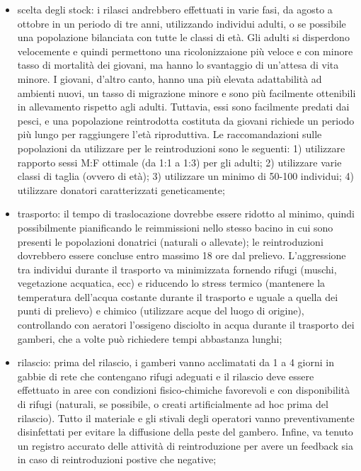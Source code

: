 \documentclass[11pt,a4paper,italian,twoside,openany]{memoir}
\begin{document}
\begin{itemize}
  \item scelta degli stock: i rilasci andrebbero effettuati in varie fasi, da agosto a ottobre in un periodo di tre anni, utilizzando individui adulti, o se possibile una popolazione bilanciata con tutte le classi di età. Gli adulti si disperdono velocemente e quindi permettono una ricolonizzaione più veloce e con minore tasso di mortalità dei giovani, ma hanno lo svantaggio di un'attesa di vita minore. I giovani, d'altro canto, hanno una più elevata adattabilità ad ambienti nuovi, un tasso di migrazione minore e sono più facilmente ottenibili in allevamento rispetto agli adulti. Tuttavia, essi sono facilmente predati dai pesci, e una popolazione reintrodotta costituta da giovani richiede un periodo più lungo per raggiungere l'età riproduttiva. Le raccomandazioni \cite{Souty-Grosset 2009} sulle popolazioni da utilizzare per le reintroduzioni sono le seguenti: 1) utilizzare rapporto sessi M:F ottimale (da 1:1 a 1:3) per gli adulti; 2) utilizzare varie classi di taglia (ovvero di età); 3) utilizzare un minimo di 50-100 individui; 4) utilizzare donatori caratterizzati geneticamente;
  \item trasporto: il tempo di traslocazione dovrebbe essere ridotto al minimo, quindi possibilmente pianificando le reimmissioni nello stesso bacino in cui sono presenti le popolazioni donatrici (naturali o allevate); le reintroduzioni dovrebbero essere concluse entro massimo 18 ore dal prelievo. L'aggressione tra individui durante il trasporto va minimizzata fornendo rifugi (muschi, vegetazione acquatica, ecc) e riducendo lo stress termico (mantenere la temperatura dell'acqua costante durante il trasporto e uguale a quella dei punti di prelievo) e chimico (utilizzare acque del luogo di origine), controllando con aeratori l'ossigeno disciolto in acqua durante il trasporto dei gamberi, che a volte può richiedere tempi abbastanza lunghi;
  \item rilascio: prima del rilascio, i gamberi vanno acclimatati da 1 a 4 giorni in gabbie di rete che contengano rifugi adeguati e il rilascio deve essere effettuato in aree con condizioni fisico-chimiche favorevoli e con disponibilità di rifugi (naturali, se possibile, o creati artificialmente ad hoc prima del rilascio). Tutto il materiale e gli stivali degli operatori vanno preventivamente disinfettati per evitare la diffusione della peste del gambero. Infine, va tenuto un registro accurato delle attività di reintroduzione per avere un feedback sia in caso di reintroduzioni postive che negative;
\end{itemize}
\end{document}
